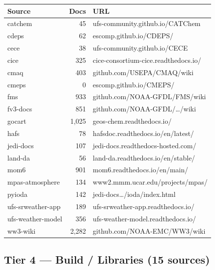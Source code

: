 \documentclass[11pt,letterpaper]{article}
\begin{document}
\begin{longtable}{p{3.5cm}rp{7cm}}
\toprule
\textbf{Source} & \textbf{Docs} & \textbf{URL} \\
\midrule
\endhead
catchem & 45 & ufs-community.github.io/CATChem \\
cdeps & 62 & escomp.github.io/CDEPS/ \\
cece & 38 & ufs-community.github.io/CECE \\
cice & 325 & cice-consortium-cice.readthedocs.io/ \\
cmaq & 403 & github.com/USEPA/CMAQ/wiki \\
cmeps & 0 & escomp.github.io/CMEPS/ \\
fms & 933 & github.com/NOAA-GFDL/FMS/wiki \\
fv3-docs & 851 & github.com/NOAA-GFDL/\ldots/wiki \\
gocart & 1,025 & geos-chem.readthedocs.io/ \\
hafs & 78 & hafsdoc.readthedocs.io/en/latest/ \\
jedi-docs & 107 & jedi-docs.readthedocs-hosted.com/ \\
land-da & 56 & land-da.readthedocs.io/en/stable/ \\
mom6 & 901 & mom6.readthedocs.io/en/main/ \\
mpas-atmosphere & 134 & www2.mmm.ucar.edu/projects/mpas/ \\
pyioda & 142 & jedi-docs\ldots/ioda/index.html \\
ufs-srweather-app & 189 & ufs-srweather-app.readthedocs.io/ \\
ufs-weather-model & 356 & ufs-weather-model.readthedocs.io/ \\
ww3-wiki & 2,282 & github.com/NOAA-EMC/WW3/wiki \\
\bottomrule
\end{longtable}

\subsection{Tier 4 — Build / Libraries (15 sources)}
\end{document}
